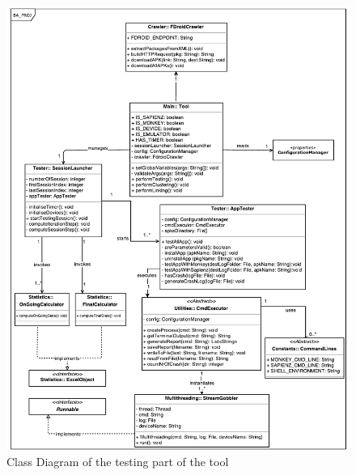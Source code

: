 
\begin{figure}[t]
\centering 
\includegraphics[width=\columnwidth]{diagrams/TesterClassDiagram.pdf} 
\caption{Class Diagram of the testing part of the tool }
\label{testerDiagram}
\vspace{-3mm} 
\end{figure}